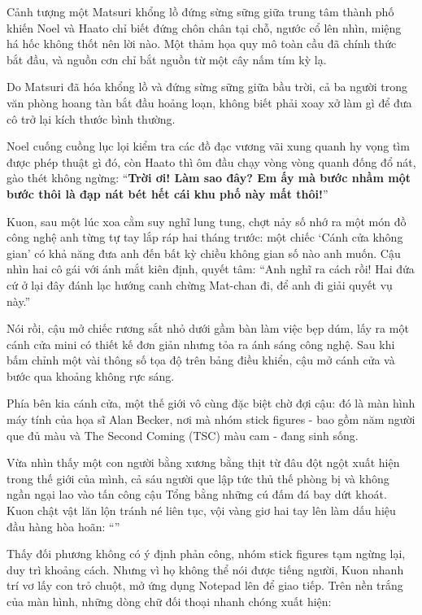 \documentclass[../main.tex]{subfiles}
\begin{document}

Cảnh tượng một Matsuri khổng lồ đứng sừng sững giữa trung tâm thành phố khiến Noel và Haato chỉ biết đứng chôn chân tại chỗ, ngước cổ lên nhìn, miệng há hốc không thốt nên lời nào. Một thảm họa quy mô toàn cầu đã chính thức bắt đầu, và nguồn cơn chỉ bắt nguồn từ một cây nấm tím kỳ lạ.

\omk

Do Matsuri đã hóa khổng lồ và đứng sừng sững giữa bầu trời, cả ba người trong văn phòng hoang tàn bắt đầu hoảng loạn, không biết phải xoay xở làm gì để đưa cô trở lại kích thước bình thường.

Noel cuống cuồng lục lọi kiểm tra các đồ đạc vương vãi xung quanh hy vọng tìm được phép thuật gì đó, còn Haato thì ôm đầu chạy vòng vòng quanh đống đổ nát, gào thét không ngừng: ``\textbf{Trời ơi! Làm sao đây? Em ấy mà bước nhầm một bước thôi là đạp nát bét hết cái khu phố này mất thôi!}''

Kuon, sau một lúc xoa cằm suy nghĩ lung tung, chợt nảy số nhớ ra một món đồ công nghệ anh từng tự tay lắp ráp hai tháng trước: một chiếc `Cánh cửa không gian' có khả năng đưa anh đến bất kỳ chiều không gian số nào anh muốn. Cậu nhìn hai cô gái với ánh mắt kiên định, quyết tâm: ``Anh nghĩ ra cách rồi! Hai đứa cứ ở lại đây đánh lạc hướng canh chừng Mat-chan đi, để anh đi giải quyết vụ này.''

Nói rồi, cậu mở chiếc rương sắt nhỏ dưới gầm bàn làm việc bẹp dúm, lấy ra một cánh cửa mini có thiết kế đơn giản nhưng tỏa ra ánh sáng công nghệ. Sau khi bấm chỉnh một vài thông số tọa độ trên bảng điều khiển, cậu mở cánh cửa và bước qua khoảng không rực sáng.

Phía bên kia cánh cửa, một thế giới vô cùng đặc biệt chờ đợi cậu: đó là màn hình máy tính của họa sĩ Alan Becker, nơi mà nhóm stick figures - bao gồm năm người que đủ màu và The Second Coming (TSC) màu cam - đang sinh sống.

Vừa nhìn thấy một con người bằng xương bằng thịt từ đâu đột ngột xuất hiện trong thế giới của mình, cả sáu người que lập tức thủ thế phòng bị và không ngần ngại lao vào tấn công cậu Tổng bằng những cú đấm đá bay dứt khoát. Kuon chật vật lăn lộn tránh né liên tục, vội vàng giơ hai tay lên làm dấu hiệu đầu hàng hòa hoãn: ``''

Thấy đối phương không có ý định phản công, nhóm stick figures tạm ngừng lại, duy trì khoảng cách. Nhưng vì họ không thể nói được tiếng người, Kuon nhanh trí vơ lấy con trỏ chuột, mở ứng dụng Notepad lên để giao tiếp. Trên nền trắng của màn hình, những dòng chữ đối thoại nhanh chóng xuất hiện:
\end{document}
